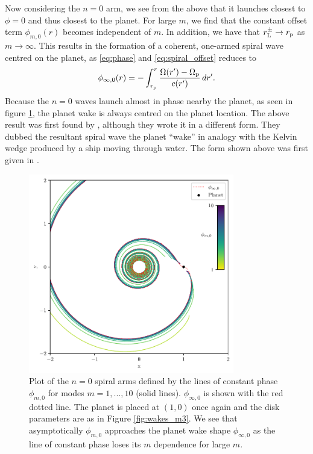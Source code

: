 Now considering the $n=0$ arm, we see from the above that it launches closest to $\phi=0$ and thus closest to the planet.
For large $m$, we find that the constant offset term $\phi_{m,0}(r)$ becomes independent of $m$.
In addition, we have that $r_{\rm L}^\pm \rightarrow r_{\rm p}$ as $m \rightarrow \infty$.
This results in the formation of a coherent, one-armed spiral wave centred on the planet, as \ref{eq:phase} and \ref{eq:spiral_offset} reduces to
\begin{align}
    \phi_{\infty,0}(r) = - \int_{r_{\rm p}}^ r \frac{\Omega(r') - \Omega_{\rm p}}{c(r')} \, dr'. \label{eq:planet_wake}
\end{align}
Because the $n=0$ waves launch almost in phase nearby the planet, as seen in figure \ref{fig:planet_wake}, the planet wake is always centred on the planet location. 
The above result was first found by \citet{ogilvie2002}, although they wrote it in a different form. 
They dubbed the resultant spiral wave the planet ``wake'' in analogy with the Kelvin wedge produced by a ship moving through water.
The form shown above was first given in \citet{rafikov2002a}.

\begin{figure}
    \centering
    \includegraphics[width = 0.8\textwidth]{figures/planet_wake_shape.pdf}
    \caption{Plot of the $n=0$ spiral arms defined by the lines of constant phase $\phi_{m,0}$ for modes $m=1,...,10$ (solid lines).
    $\phi_{\infty,0}$ is shown with the red dotted line.
    The planet is placed at $(1,0)$ once again and the disk parameters are as in Figure \ref{fig:wakes_m3}.
    We see that asymptotically $\phi_{m,0}$ approaches the planet wake shape $\phi_{\infty,0}$ as the line of constant phase loses its $m$ dependence for large $m$.}
    \label{fig:planet_wake}
\end{figure}


